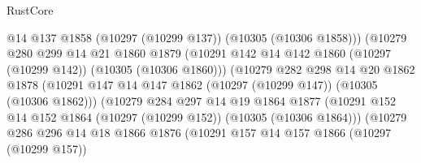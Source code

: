 \begin{lexlean}{RustCore}
\begin{coremodule}
                                @14
                                @137
                                @1858
                                (@10297 (@10299 @137))
                                (@10305 (@10306 @1858)))
                              (@10279
                                @280
                                @299
                                @14
                                @21
                                @1860
                                @1879
                                (@10291
                                  @142
                                  @14
                                  @142
                                  @1860
                                  (@10297 (@10299 @142))
                                  (@10305 (@10306 @1860)))
                                (@10279
                                  @282
                                  @298
                                  @14
                                  @20
                                  @1862
                                  @1878
                                  (@10291
                                    @147
                                    @14
                                    @147
                                    @1862
                                    (@10297 (@10299 @147))
                                    (@10305 (@10306 @1862)))
                                  (@10279
                                    @284
                                    @297
                                    @14
                                    @19
                                    @1864
                                    @1877
                                    (@10291
                                      @152
                                      @14
                                      @152
                                      @1864
                                      (@10297 (@10299 @152))
                                      (@10305 (@10306 @1864)))
                                    (@10279
                                      @286
                                      @296
                                      @14
                                      @18
                                      @1866
                                      @1876
                                      (@10291
                                        @157
                                        @14
                                        @157
                                        @1866
                                        (@10297 (@10299 @157))

\end{coremodule}
\end{lexlean}
